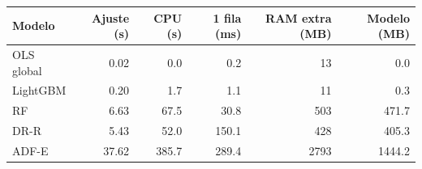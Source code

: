 \begin{tabularx}{\textwidth}{X *{5}{r}}
\toprule
Modelo & Ajuste (s) & CPU (s) & 1 fila (ms) & RAM extra (MB) & Modelo (MB) \\
\midrule
OLS global & 0.02 & 0.0 & 0.2 & 13 & 0.0 \\
LightGBM & 0.20 & 1.7 & 1.1 & 11 & 0.3 \\
RF & 6.63 & 67.5 & 30.8 & 503 & 471.7 \\
DR-R & 5.43 & 52.0 & 150.1 & 428 & 405.3 \\
ADF-E & 37.62 & 385.7 & 289.4 & 2793 & 1444.2 \\
\bottomrule
\end{tabularx}
